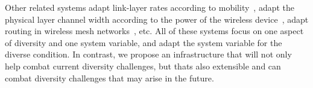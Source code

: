 Other related systems adapt link-layer rates according to 
mobility~\cite{ravindranath_nsdi11}, adapt the physical layer channel 
width according to the power of the wireless device~\cite{chandra_sigcomm08}, 
adapt routing in wireless mesh networks~\cite{rozner_tmc09}, etc. All 
of these systems focus on one aspect of diversity and one system variable, 
and adapt the system variable for the diverse condition. In contrast, we 
propose an infrastructure that will not only help combat current diversity 
challenges, but thats also extensible and can combat diversity challenges 
that may arise in the future. 

\fi

